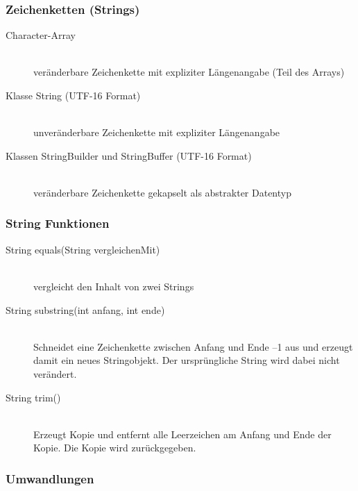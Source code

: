 \documentclass[a4paper,10pt]{article}
\begin{document}
\subsubsection{Zeichenketten (Strings)}
\begin{description}
	\item[Character-Array] \hfill \\
		ver\"anderbare Zeichenkette mit expliziter L\"angenangabe (Teil des Arrays)
	\item[Klasse String (UTF-16 Format)] \hfill \\
		unver\"anderbare Zeichenkette mit expliziter L\"angenangabe
	\item[Klassen StringBuilder und StringBuffer (UTF-16 Format)] \hfill \\
		ver\"anderbare Zeichenkette gekapselt als abstrakter Datentyp
\end{description}

\subsubsection{String Funktionen}
\begin{description}
	\item[String equals(String vergleichenMit)] \hfill \\
		vergleicht den Inhalt von zwei Strings
	\item[String substring(int anfang, int ende)] \hfill \\
		Schneidet eine Zeichenkette zwischen Anfang und Ende –1 aus und erzeugt damit ein neues Stringobjekt. Der urspr\"ungliche String wird dabei nicht ver\"andert.
	\item[String trim()] \hfill \\
		Erzeugt Kopie und entfernt alle Leerzeichen am Anfang und Ende der Kopie. Die Kopie wird zur\"uckgegeben.
\end{description}

\subsubsection{Umwandlungen}



\newpage
\end{document}
